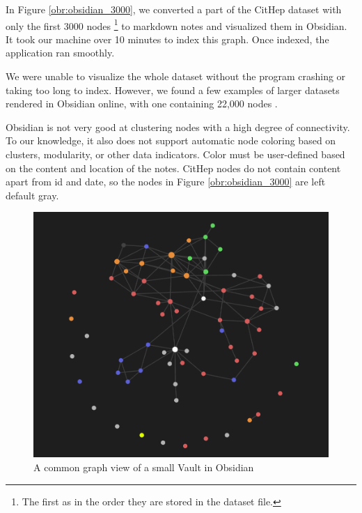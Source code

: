 In Figure \ref{obr:obsidian_3000}, we converted a part of the CitHep dataset with only the first 3000 nodes
\footnote{The first as in the order they are stored in the dataset file.}
to markdown notes and visualized them in Obsidian.
It took our machine over 10 minutes to index this graph.
Once indexed, the application ran smoothly.

We were unable to visualize the whole dataset without the program crashing or taking too long to index.
However, we found a few examples of larger datasets rendered in Obsidian online, with one containing 22,000 nodes
\cite{obsidian_reddit_large_graph}.

Obsidian is not very good at clustering nodes with a high degree of connectivity.
To our knowledge, it also does not support automatic node coloring based on clusters, modularity, or other data indicators.
Color must be user-defined based on the content and location of the notes.
CitHep nodes do not contain content apart from id and date, so the nodes in Figure \ref{obr:obsidian_3000} are left default gray.

\begin{figure}[h]\centering
  \includegraphics[width=140mm, keepaspectratio]{img/obsidian_common_notes.png}
  \caption{A common graph view of a small Vault in Obsidian}
  \label{obr:obsidian_common}
\end{figure}


